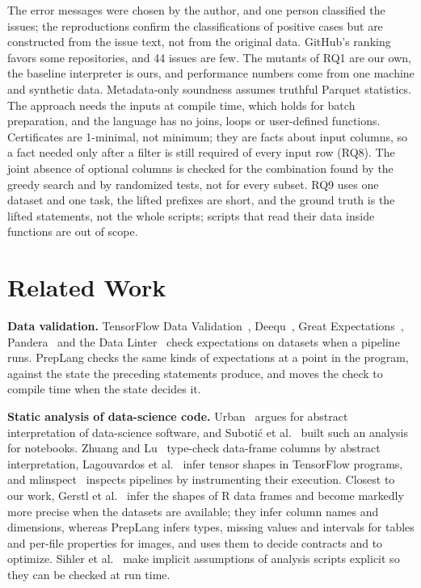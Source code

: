 \documentclass[conference]{IEEEtran}
\begin{document}
The error messages were chosen by the author, and one person classified the issues; the
reproductions confirm the classifications of positive cases but are constructed from the issue
text, not from the original data. GitHub's ranking favors some repositories, and 44 issues are few.
The mutants of RQ1 are our own, the baseline interpreter is ours, and performance numbers come from
one machine and synthetic data. Metadata-only soundness assumes truthful Parquet statistics. The
approach needs the inputs at compile time, which holds for batch preparation, and the language has
no joins, loops or user-defined functions. Certificates are 1-minimal, not minimum; they are facts
about input columns, so a fact needed only after a filter is still required of every input row
(RQ8). The joint absence of optional columns is checked for the combination found by the greedy
search and by randomized tests, not for every subset. RQ9 uses one dataset and one task, the lifted
prefixes are short, and the ground truth is the lifted statements, not the whole scripts; scripts
that read their data inside functions are out of scope.

\section{Related Work}

\textbf{Data validation.} TensorFlow Data Validation~\cite{breck2019}, Deequ~\cite{schelter2018},
Great Expectations~\cite{gx}, Pandera~\cite{bantilan2020} and the Data Linter~\cite{hynes2017}
check expectations on datasets when a pipeline runs. PrepLang checks the same kinds of expectations
at a point in the program, against the state the preceding statements produce, and moves the check
to compile time when the state decides it.

\textbf{Static analysis of data-science code.} Urban~\cite{urban2019} argues for abstract
interpretation of data-science software, and Subotić et al.~\cite{subotic2022} built such an
analysis for notebooks. Zhuang and Lu~\cite{zhuang2022} type-check data-frame columns by abstract
interpretation, Lagouvardos et al.~\cite{lagouvardos2020} infer tensor shapes in TensorFlow
programs, and mlinspect~\cite{grafberger2022} inspects pipelines by instrumenting their execution.
Closest to our work, Gerstl et al.~\cite{gerstl2026} infer the shapes of R data frames and become
markedly more precise when the datasets are available; they infer column names and dimensions,
whereas PrepLang infers types, missing values and intervals for tables and per-file properties for
images, and uses them to decide contracts and to optimize. Sihler et al.~\cite{sihler2026} make
implicit assumptions of analysis scripts explicit so they can be checked at run time.
\end{document}
